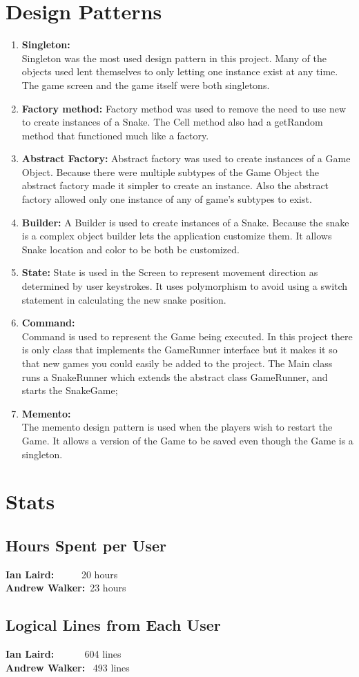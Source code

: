 \documentclass[titlepage]{article}
\begin{document}
	\section{Design Patterns}
		\begin{enumerate}
			\item \textbf{Singleton:}\\
				Singleton was the most used design pattern in this project. Many of the objects used lent themselves to only letting one instance exist at any
				time. The game screen and the game itself were both singletons.
			\item \textbf{Factory method:}
				Factory method was used to remove the need to use new to create instances of a Snake. The Cell method also had a getRandom method that functioned much like a factory.
			\item \textbf{Abstract Factory:}
				Abstract factory was used to create instances of a Game Object. Because there were multiple subtypes of the Game Object the abstract factory made it simpler to create an instance. Also the abstract factory allowed only one instance of any of game's subtypes to exist.
			\item \textbf{Builder:}
				A Builder is used to create instances of a Snake. Because the snake is a complex object builder lets the application customize them. It allows Snake location and color to be both be customized.
			\item \textbf{State:}
				State is used in the Screen to represent movement direction as determined by user keystrokes. It uses polymorphism to avoid using a switch statement in calculating the new snake position.
			\item \textbf{Command:}\\
				Command is used to represent the Game being executed. In this project there is only class that implements the GameRunner interface but it makes it so that new games you could easily be added to the project. The Main class runs a SnakeRunner which extends the abstract class GameRunner, and starts the SnakeGame;
			\item \textbf{Memento:}\\
				The memento design pattern is used when the players wish to restart the Game. It allows a version of the Game to be saved even though the Game is a singleton.
		\end{enumerate}
	\section{Stats}
	\subsection{Hours Spent per User}
	\textbf{Ian Laird:} ~~~~~20 hours\\
	\textbf{Andrew Walker:}~23 hours
	\subsection{Logical Lines from Each User}
	\textbf{Ian Laird:} ~~~~~ 604 lines\\
	\textbf{Andrew Walker:}~ 493 lines
\end{document}
